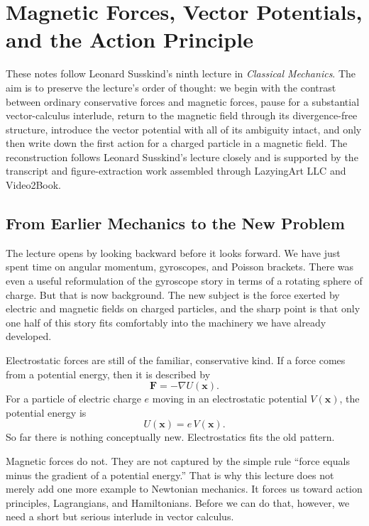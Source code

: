 \chapter{Magnetic Forces, Vector Potentials, and the Action Principle}

These notes follow Leonard Susskind's ninth lecture in \emph{Classical Mechanics}. The aim is to preserve the lecture's order of thought: we begin with the contrast between ordinary conservative forces and magnetic forces, pause for a substantial vector-calculus interlude, return to the magnetic field through its divergence-free structure, introduce the vector potential with all of its ambiguity intact, and only then write down the first action for a charged particle in a magnetic field. The reconstruction follows Leonard Susskind's lecture closely and is supported by the transcript and figure-extraction work assembled through LazyingArt LLC and Video2Book.

\section{From Earlier Mechanics to the New Problem}

The lecture opens by looking backward before it looks forward. We have just spent time on angular momentum, gyroscopes, and Poisson brackets. There was even a useful reformulation of the gyroscope story in terms of a rotating sphere of charge. But that is now background. The new subject is the force exerted by electric and magnetic fields on charged particles, and the sharp point is that only one half of this story fits comfortably into the machinery we have already developed.

Electrostatic forces are still of the familiar, conservative kind. If a force comes from a potential energy, then it is described by
\begin{equation}
\mathbf F=-\nabla U(\mathbf x).
\end{equation}
For a particle of electric charge \(e\) moving in an electrostatic potential \(V(\mathbf x)\), the potential energy is
\begin{equation}
U(\mathbf x)=e\,V(\mathbf x).
\end{equation}
So far there is nothing conceptually new. Electrostatics fits the old pattern.

Magnetic forces do not. They are not captured by the simple rule ``force equals minus the gradient of a potential energy.'' That is why this lecture does not merely add one more example to Newtonian mechanics. It forces us toward action principles, Lagrangians, and Hamiltonians. Before we can do that, however, we need a short but serious interlude in vector calculus.


